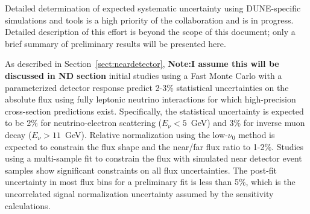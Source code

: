 %
Detailed determination of expected systematic uncertainty using DUNE-specific
simulations and tools is a high priority of the collaboration and is in progress.
Detailed description of this effort is beyond the scope of this document; only
a brief summary of preliminary results will be presented here. 

As described in
Section~\ref{sect:neardetector}, 
{\bf Note:I assume this will be discussed in ND section}
initial studies using a Fast Monte Carlo with a parameterized detector response
predict 2-3\% statistical uncertainties on the absolute flux using fully 
leptonic neutrino interactions for which high-precision cross-section predictions 
exist. Specifically,
the statistical uncertainty is expected to be 2\% for neutrino-electron
scattering ($E_\nu<5$~GeV) and 3\% for inverse muon decay ($E_\nu>11$~GeV).
Relative normalization using the low-$\nu_0$ method is
expected to constrain the flux shape and the near/far flux ratio to 1-2\%.
Studies using a multi-sample fit  to constrain the flux with simulated near detector
event samples show significant constraints on all flux
uncertainties. The post-fit uncertainty 
in most flux bins for a preliminary fit is less
than 5\%, which is the uncorrelated \numu signal normalization
uncertainty assumed by the sensitivity calculations. 

